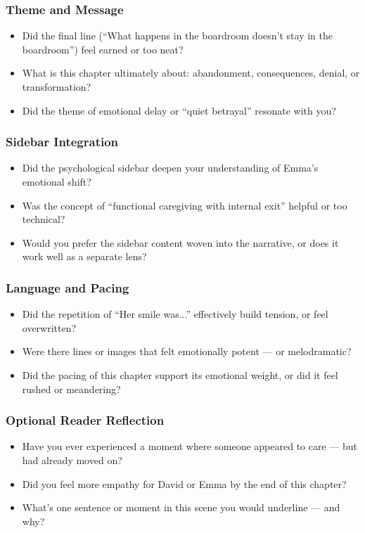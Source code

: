 \subsubsection{Theme and Message}

\begin{itemize}
  \item Did the final line (“What happens in the boardroom doesn’t stay in the boardroom”) feel earned or too neat?
  \item What is this chapter ultimately about: abandonment, consequences, denial, or transformation?
  \item Did the theme of emotional delay or “quiet betrayal” resonate with you?
\end{itemize}

\subsubsection{Sidebar Integration}

\begin{itemize}
  \item Did the psychological sidebar deepen your understanding of Emma’s emotional shift?
  \item Was the concept of “functional caregiving with internal exit” helpful or too technical?
  \item Would you prefer the sidebar content woven into the narrative, or does it work well as a separate lens?
\end{itemize}

\subsubsection{Language and Pacing}

\begin{itemize}
  \item Did the repetition of “Her smile was...” effectively build tension, or feel overwritten?
  \item Were there lines or images that felt emotionally potent — or melodramatic?
  \item Did the pacing of this chapter support its emotional weight, or did it feel rushed or meandering?
\end{itemize}

\subsubsection{Optional Reader Reflection}

\begin{itemize}
  \item Have you ever experienced a moment where someone appeared to care — but had already moved on?
  \item Did you feel more empathy for David or Emma by the end of this chapter?
  \item What’s one sentence or moment in this scene you would underline — and why?
\end{itemize}